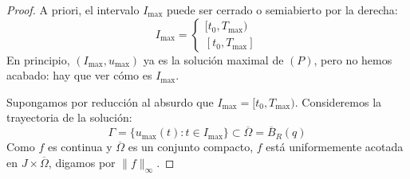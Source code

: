 \begin{proof}
    A priori, el intervalo $I_{\text{max}}$ puede ser cerrado o semiabierto por la derecha:
    \[
        I_{\text{max}} = 
        \begin{cases}
            [t_0, T_{\text{max}}) \\
            [t_0, T_{\text{max}}]
        \end{cases}
    \]
    En principio, $(I_{\text{max}}, u_{\text{max}})$ ya es la solución maximal de $(P)$, pero no hemos acabado: hay que ver cómo es $I_{\text{max}}$.

    Supongamos por reducción al absurdo que $I_{\text{max}} = [t_0, T_{\text{max}})$. Consideremos la trayectoria de la solución:
    \[
        \Gamma = \{ u_{\text{max}}(t) : t \in I_{\text{max}} \} \subset \overline{\Omega} = \overline{B}_R(q)
    \]
    Como $f$ es continua y $\overline{\Omega}$ es un conjunto compacto, $f$ está uniformemente acotada en $J \times \overline{\Omega}$, digamos por $\| f \|_\infty$. 
    

\end{proof}
